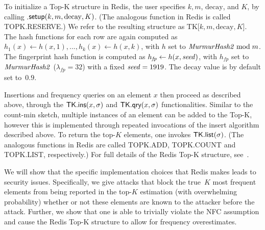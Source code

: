 To initialize a Top-K structure in Redis, the user specifies $k, m$, $\mathrm{decay}$, and $K$, by calling \rTK.$\textsf{setup}(k, m, \mathrm{decay}, K)$. (The analogous function in Redis is called \textsf{TOPK.RESERVE}.) We refer to the resulting structure as TK[$k, m, \mathrm{decay}, K$].
The hash functions for each row are again computed as $h_1(x) \gets h(x, 1), ..., h_k(x) \gets h(x, k)$, with $h$ set to $\mathit{MurmurHash2} \bmod m$. The fingerprint hash function is computed as $h_\mathit{fp} \gets h(x, \mathit{seed})$, with $h_\mathit{fp}$ set to $\mathit{MurmurHash2}$ ($\lambda_{\mathit{fp}} = 32$) with a fixed $\mathit{seed} = 1919$. The $\mathrm{decay}$ value is by default set to~$0.9$. 

Insertions and frequency queries on an element $x$ then proceed as described above, through the $\textsf{TK}.\textsf{ins}(x, \sigma)$ and $\textsf{TK}.\textsf{qry}(x, \sigma)$ functionalities. Similar to the count-min sketch, multiple instances of an element can be added to the Top-K, however this is implemented through repeated invocations of the insert algorithm described above. 
To return the top-$K$ elements, one invokes $\textsf{TK}.\textsf{list}(\sigma)$. (The analogous functions in Redis are called \textsf{TOPK.ADD}, \textsf{TOPK.COUNT} and \textsf{TOPK.LIST}, respectively.) For full details of the Redis Top-K structure, see~. 

We will show that the specific implementation choices that Redis makes leads to security issues. Specifically, we give attacks that block the true~$K$ most frequent elements from being reported in the top-$K$ estimation (with overwhelming probability) whether or not these elements are known to the attacker before the attack. Further, we show that one is able to trivially violate the NFC assumption and cause the Redis Top-K structure to allow for frequency overestimates.